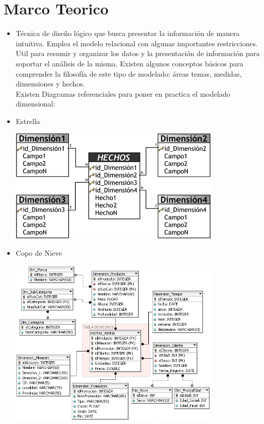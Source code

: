 \section{Marco Teorico} 

\begin{itemize}
\subsection{Modelo Dimensional}
	\item Técnica de diseño lógico que busca presentar la información de manera intuitiva. Emplea el modelo relacional con algunas importantes restricciones. Util para resumir y organizar los datos y la presentación de información para soportar el análisis de la misma. Existen algunos conceptos básicos para comprender la filosofía de este tipo de modelado: áreas temas, medidas, dimensiones y hechos.
\\
Existen Diagramas referenciales para poner en practica el modelado dimensional:

\item Estrella
\begin{center}
	\includegraphics[width=10cm]{./Imagenes/1} 
\end{center}

\item Copo de Nieve
\begin{center}
\includegraphics[width=10cm]{./Imagenes/2}
\end{center}



\end{itemize}
